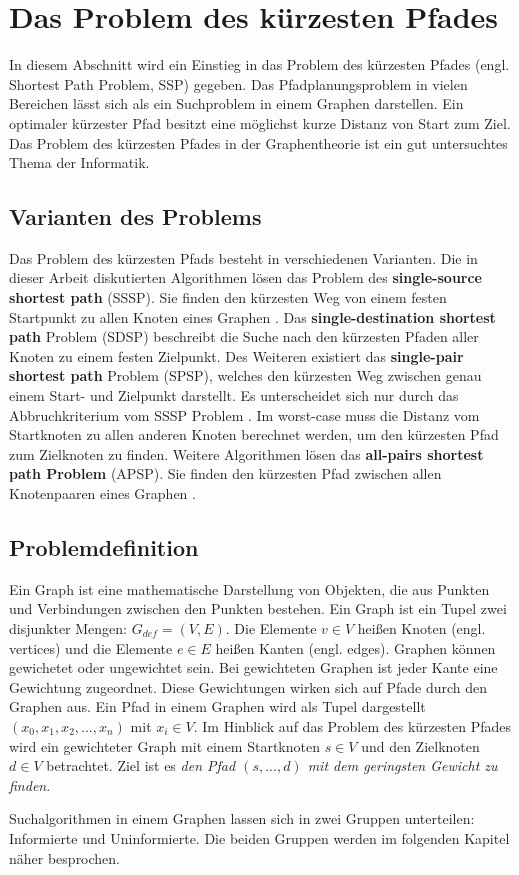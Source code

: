 \chapter{Das Problem des kürzesten Pfades}

In diesem Abschnitt wird ein Einstieg in das Problem des kürzesten Pfades (engl. Shortest Path Problem, SSP) gegeben. Das Pfadplanungsproblem in vielen Bereichen lässt sich als ein Suchproblem in einem Graphen darstellen\cite{HartNilssonandRaphael.1968}. Ein optimaler kürzester Pfad besitzt eine möglichst kurze Distanz von Start zum Ziel. Das Problem des kürzesten Pfades in der Graphentheorie ist ein gut untersuchtes Thema der Informatik\cite{Madkour.2017}.


\section{Varianten des Problems}

Das Problem des kürzesten Pfads besteht in verschiedenen Varianten. Die in dieser Arbeit diskutierten Algorithmen lösen das Problem des \textbf{single-source shortest path} (SSSP). Sie finden den kürzesten Weg von einem festen Startpunkt zu allen Knoten eines Graphen \cite{Gu.2018}. Das \textbf{single-destination shortest path} Problem (SDSP)  beschreibt die Suche nach den kürzesten Pfaden aller Knoten zu einem festen Zielpunkt. Des Weiteren existiert das \textbf{single-pair shortest path} Problem (SPSP), welches den kürzesten Weg zwischen genau einem Start- und Zielpunkt darstellt. Es unterscheidet sich nur durch das Abbruchkriterium vom SSSP Problem \cite{Ottmann.2017}. Im worst-case muss die Distanz vom Startknoten zu allen anderen Knoten berechnet werden, um den kürzesten Pfad zum Zielknoten zu finden. Weitere Algorithmen lösen das \textbf{all-pairs shortest path Problem} (APSP). Sie finden den kürzesten Pfad zwischen allen Knotenpaaren eines Graphen \cite{Cormen.2009}.


\section{Problemdefinition}

Ein Graph ist eine mathematische Darstellung von Objekten, die aus Punkten und Verbindungen zwischen den Punkten bestehen. Ein Graph ist ein Tupel zwei disjunkter Mengen: $G_{def}= (V,E)$. Die Elemente $v \in V$ heißen Knoten (engl. vertices) und die Elemente $e \in E$ heißen Kanten (engl. edges). Graphen können gewichetet oder ungewichtet sein. Bei gewichteten Graphen ist jeder Kante eine Gewichtung zugeordnet. Diese Gewichtungen wirken sich auf Pfade durch den Graphen aus\cite{Gross.2004}. Ein Pfad in einem Graphen wird als Tupel dargestellt $\left ( x_{0}, x_{1}, x_{2}, ..., x_{n} \right )$ mit $x_{i} \in V$.  Im Hinblick auf das Problem des kürzesten Pfades wird ein gewichteter Graph mit einem Startknoten $s \in V$ und den Zielknoten $d \in V$ betrachtet. Ziel ist es \textit{den Pfad  $\left ( s, ..., d \right )$ mit dem geringsten Gewicht zu finden}\cite{Madkour.2017}. 



Suchalgorithmen in einem Graphen lassen sich in zwei Gruppen unterteilen:
Informierte und Uninformierte. Die beiden Gruppen werden im folgenden Kapitel
näher besprochen.

